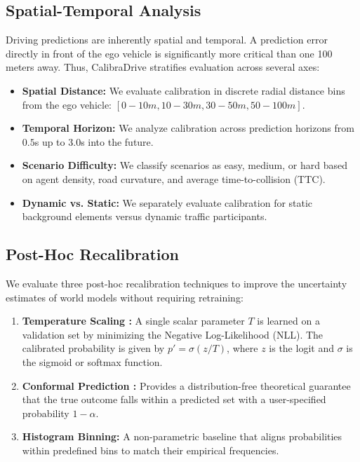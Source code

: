 \subsection{Spatial-Temporal Analysis}
Driving predictions are inherently spatial and temporal. A prediction error directly in front of the ego vehicle is significantly more critical than one 100 meters away. Thus, CalibraDrive stratifies evaluation across several axes:
\begin{itemize}
    \item \textbf{Spatial Distance:} We evaluate calibration in discrete radial distance bins from the ego vehicle: $[0-10m, 10-30m, 30-50m, 50-100m]$.
    \item \textbf{Temporal Horizon:} We analyze calibration across prediction horizons from $0.5$s up to $3.0$s into the future.
    \item \textbf{Scenario Difficulty:} We classify scenarios as easy, medium, or hard based on agent density, road curvature, and average time-to-collision (TTC).
    \item \textbf{Dynamic vs. Static:} We separately evaluate calibration for static background elements versus dynamic traffic participants.
\end{itemize}

\subsection{Post-Hoc Recalibration}
We evaluate three post-hoc recalibration techniques to improve the uncertainty estimates of world models without requiring retraining:
\begin{enumerate}
    \item \textbf{Temperature Scaling \cite{guo2017calibration}:} A single scalar parameter $T$ is learned on a validation set by minimizing the Negative Log-Likelihood (NLL). The calibrated probability is given by $p' = \sigma(z/T)$, where $z$ is the logit and $\sigma$ is the sigmoid or softmax function.
    \item \textbf{Conformal Prediction \cite{romano2019conformal}:} Provides a distribution-free theoretical guarantee that the true outcome falls within a predicted set with a user-specified probability $1-\alpha$.
    \item \textbf{Histogram Binning:} A non-parametric baseline that aligns probabilities within predefined bins to match their empirical frequencies.
\end{enumerate}

